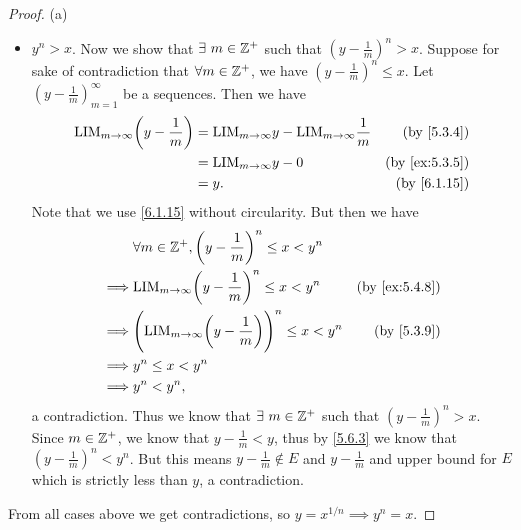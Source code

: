 \begin{proof}{(a)}
\begin{itemize}
          But this means \(y + \frac{1}{m} \in E\) and \(y + \frac{1}{m} \leq y\), a contradiction.
    \item \(y^n > x\).
          Now we show that \(\exists\ m \in \mathbb{Z}^+\) such that \((y - \frac{1}{m})^n > x\).
          Suppose for sake of contradiction that \(\forall m \in \mathbb{Z}^+\), we have \((y - \frac{1}{m})^n \leq x\).
          Let \((y - \frac{1}{m})_{m = 1}^\infty\) be a sequences.
          Then we have
          \begin{align*}
            \text{LIM}_{m \to \infty} \bigg(y - \frac{1}{m}\bigg) & = \text{LIM}_{m \to \infty} y - \text{LIM}_{m \to \infty} \frac{1}{m} & \text{(by \cref{5.3.4})}    \\
                                                                  & = \text{LIM}_{m \to \infty} y - 0                                     & \text{(by \cref{ex:5.3.5})} \\
                                                                  & = y.                                                                  & \text{(by \cref{6.1.15})}
          \end{align*}
          Note that we use \cref{6.1.15} without circularity.
          But then we have
          \begin{align*}
                     & \forall m \in \Z^+, \bigg(y - \frac{1}{m}\bigg)^n \leq x < y^n                                                 \\
            \implies & \text{LIM}_{m \to \infty} \bigg(y - \frac{1}{m}\bigg)^n \leq x < y^n             & \text{(by \cref{ex:5.4.8})} \\
            \implies & \Bigg(\text{LIM}_{m \to \infty} \bigg(y - \frac{1}{m}\bigg)\Bigg)^n \leq x < y^n & \text{(by \cref{5.3.9})}    \\
            \implies & y^n \leq x < y^n                                                                                               \\
            \implies & y^n < y^n,
          \end{align*}
          a contradiction.
          Thus we know that \(\exists\ m \in \mathbb{Z}^+\) such that \((y - \frac{1}{m})^n > x\).
          Since \(m \in \mathbb{Z}^+\), we know that \(y - \frac{1}{m} < y\), thus by \cref{5.6.3} we know that \((y - \frac{1}{m})^n < y^n\).
          But this means \(y - \frac{1}{m} \notin E\) and \(y - \frac{1}{m}\) and upper bound for \(E\) which is strictly less than \(y\), a contradiction.
  \end{itemize}
  From all cases above we get contradictions, so \(y = x^{1 / n} \implies y^n = x\).
\end{proof}

